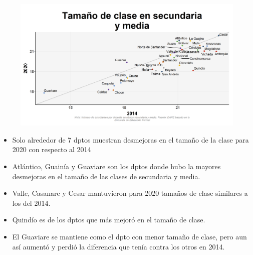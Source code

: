     \begin{figure}[H]
        \caption[Tamaño de clase en secundaria y media por departamentos - 2014 VS 2020 ]{\label{temano_sec_dpto_scatter} }
        \begin{center}
        \includegraphics[width=\textwidth,keepaspectratio]{img/var_230_scatter_time.png}
        \end{center}
    \end{figure}
            \begin{itemize}
                \item Solo alrededor de 7 dptos muestran desmejoras en el tamaño de la clase para 2020 con respecto al 2014
                \item Atlántico, Guainía y Guaviare son los dptos donde hubo la mayores desmejoras en el tamaño de las clases de secundaria y media.
                \item Valle, Casanare y Cesar mantuvieron para 2020 tamaños de clase similares a los del 2014.
                \item Quindío es de los dptos que más mejoró en el tamaño de clase.
                \item El Guaviare se mantiene como el dpto con menor tamaño de clase, pero aun así aumentó y perdió la diferencia que tenía contra los otros en 2014.
                \end{itemize}


